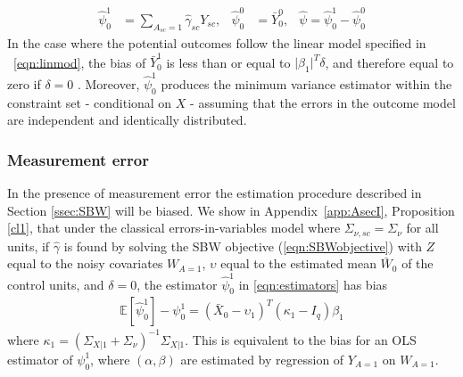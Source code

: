\documentclass[aoas]{imsart}
\theoremstyle{plain}
\theoremstyle{remark}
\begin{document}
\begin{align}\label{eqn:estimators}
\hat{\psi}_0^1 &= \sum_{A_{sc}=1} \hat{\gamma}_{sc} Y_{sc}, & \hat{\psi}_0^0 & = \bar{Y}_0^0, & \hat{\psi} = \hat{\psi}_0^1 - \hat{\psi}_0^0
\end{align}
%
In the case where the potential outcomes follow the linear model specified in ~\eqref{eqn:linmod}, the bias of $\bar{Y}^1_0$ is less than or equal to $\lvert\beta_1\rvert^T\delta$, and therefore equal to zero if $\delta = 0$ \citep{zubizarreta2015stable}. Moreover, $\hat{\psi}_0^1$ produces the minimum variance estimator within the constraint set - conditional on $X$ - assuming that the errors in the outcome model are independent and identically distributed.

\subsubsection{Measurement error}\label{ssec:methodsmsrment} 

In the presence of measurement error the estimation procedure described in Section \ref{ssec:SBW} will be biased. We show in Appendix~\ref{app:AsecI}, Proposition \ref{cl1}, that under the classical errors-in-variables model where $\Sigma_{\nu,sc} = \Sigma_{\nu}$ for all units, if $\hat{\gamma}$ is found by solving the SBW objective (\ref{eqn:SBWobjective}) with $Z$ equal to the noisy covariates $W_{A=1}$, $\upsilon$ equal to the estimated mean $\bar{W}_0$ of the control units, and $\delta=0$, the estimator $\hat{\psi}_0^1$ in \eqref{eqn:estimators} has bias
\begin{align*}
\mathbb{E}[\hat{\psi}_0^1] - \psi_0^1 = (\bar{X}_0 - \upsilon_1)^T(\kappa_1 - I_q)\beta_1 
\end{align*}
where $\kappa_1 = (\Sigma_{X|1} + \Sigma_{\nu})^{-1}\Sigma_{X|1}$. This is equivalent to the bias for an OLS estimator of $\psi_0^1$, where $(\alpha, \beta)$ are estimated by regression of $Y_{A=1}$ on $W_{A=1}$.
\end{document}
